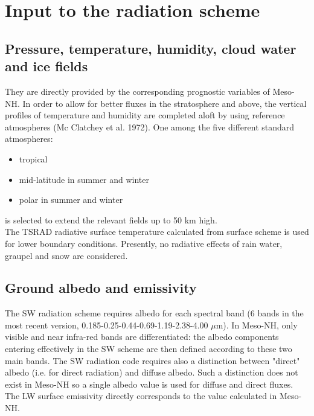 \section{Input to the radiation scheme}

\subsection{Pressure, temperature, humidity, cloud water and ice fields}

They are directly provided by the corresponding prognostic variables of Meso-NH. In order to allow for better fluxes in the stratosphere and above, the vertical profiles of temperature and humidity are completed aloft by using reference atmospheres (Mc Clatchey et al. 1972). One among the five different standard atmospheres:
\begin{itemize}

\item tropical
\item mid-latitude in summer and winter
\item polar in summer and winter

\end{itemize}

is selected to extend the relevant fields up to 50 km high.\\

The TSRAD radiative surface temperature calculated from surface scheme is used for lower boundary conditions.
Presently, no radiative effects of rain water, graupel and snow are considered. 

\subsection{Ground albedo and emissivity }

The SW radiation scheme requires albedo for each spectral band (6 bands in the 
most recent version, 0.185-0.25-0.44-0.69-1.19-2.38-4.00 $\mu$m). In  Meso-NH, only visible and near infra-red bands are differentiated: the albedo components entering effectively in the SW scheme are then defined according to these two main bands. The SW radiation code requires also a distinction between "direct" albedo (i.e. for direct radiation) and diffuse albedo. Such a distinction does not exist in Meso-NH so a single albedo value is used for diffuse and direct fluxes. 
The LW surface emissivity directly corresponds to the value calculated in Meso-NH. 

